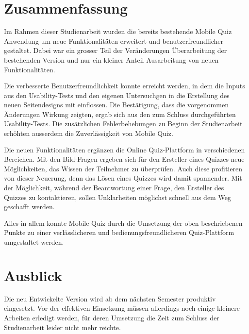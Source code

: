 
\section{Zusammenfassung}
Im Rahmen dieser Studienarbeit wurden die bereits bestehende Mobile Quiz Anwendung um neue Funktionalitäten erweitert und benutzerfreundlicher gestaltet. Dabei war ein grosser Teil der Veränderungen Überarbeitung der bestehenden Version und nur ein kleiner Anteil Ausarbeitung von neuen Funktionalitäten.

\bigskip

Die verbesserte Benutzerfreundlichkeit konnte erreicht werden, in dem die Inputs aus den \gls{Usability-Test}s und den eigenen Untersuchgen in die Erstellung des neuen Seitendesigns mit einflossen. Die Bestätigung, dass die vorgenommen Änderungen Wirkung zeigten, ergab sich aus den zum Schluss durchgeführten Usability-Tests. Die zusätzlichen Fehlerbehebungen zu Beginn der Studienarbeit erhöhten ausserdem die Zuverlässigkeit von Mobile Quiz.

\bigskip

Die neuen Funktionalitäten ergänzen die Online Quiz-Plattform in verschiedenen Bereichen. Mit den Bild-Fragen ergeben sich für den Ersteller eines Quizzes neue Möglichkeiten, das Wissen der Teilnehmer zu überprüfen. Auch diese profitieren von dieser Neuerung, denn das Lösen eines Quizzes wird damit spannender.
Mit der Möglichkeit, während der Beantwortung einer Frage, den Ersteller des Quizzes zu kontaktieren, sollen Unklarheiten möglichst schnell aus dem Weg geschafft werden.

\bigskip

Alles in allem konnte Mobile Quiz durch die Umsetzung der oben beschriebenen Punkte zu einer verlässlicheren und bedienungsfreundlicheren Quiz-Plattform umgestaltet werden.

\section{Ausblick}
Die neu Entwickelte Version wird ab dem nächsten Semester produktiv eingesetzt. Vor der effektiven Einsetzung müssen allerdings noch einige kleinere Arbeiten erledigt werden, für deren Umsetzung die Zeit zum Schluss der Studienarbeit leider nicht mehr reichte.

\bigskip

